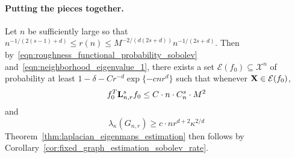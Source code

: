 \documentclass{article}
\newcommand{\1}{\mathbf{1}}
\newcommand{\Lap}{{\bf L}}
\newcommand{\Xset}{\mathcal{X}}
\theoremstyle{alden}
\theoremstyle{aldenthm}
\theoremstyle{definition}
\theoremstyle{remark}
\begin{document}
\paragraph{Putting the pieces together.}

Let $n$ be sufficiently large so that $n^{-1/(2(s - 1)+ d)} \leq r(n) \leq M^{-2/(d(2s + d))} n^{-1/(2s + d)}$. Then by~\eqref{eqn:roughness_functional_probability_sobolev} and~\eqref{eqn:neighborhood_eigenvalue_1}, there exists a set $\mathcal{E}(f_0) \subseteq \Xset^n$ of probability at least $1 - \delta - Cr^{-d}\exp\{-cnr^d\}$ such that whenever ${\bf X} \in \mathcal{E}(f_0)$,
\begin{equation*}
f_0^T \Lap_{n,r}^s f_0 \leq C \cdot n \cdot C_n^s \cdot M^2
\end{equation*}
and
\begin{equation*}
\lambda_{\kappa}(G_{n,r}) \geq c \cdot nr^{d+2}\kappa^{2/d}
\end{equation*}
Theorem~\ref{thm:laplacian_eigenmaps_estimation} then follows by Corollary~\ref{cor:fixed_graph_estimation_sobolev_rate}.


 
\end{document}
